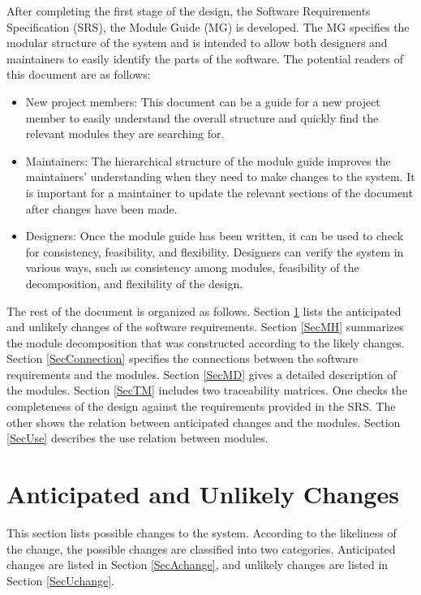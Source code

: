 \documentclass[12pt, titlepage]{article}
\begin{document}
After completing the first stage of the design, the Software Requirements
Specification (SRS), the Module Guide (MG) is developed. The MG
specifies the modular structure of the system and is intended to allow both
designers and maintainers to easily identify the parts of the software.  The
potential readers of this document are as follows:

\begin{itemize}
\item New project members: This document can be a guide for a new project member
  to easily understand the overall structure and quickly find the
  relevant modules they are searching for.
\item Maintainers: The hierarchical structure of the module guide improves the
  maintainers' understanding when they need to make changes to the system. It is
  important for a maintainer to update the relevant sections of the document
  after changes have been made.
\item Designers: Once the module guide has been written, it can be used to
  check for consistency, feasibility, and flexibility. Designers can verify the
  system in various ways, such as consistency among modules, feasibility of the
  decomposition, and flexibility of the design.
\end{itemize}

The rest of the document is organized as follows. Section
\ref{SecChange} lists the anticipated and unlikely changes of the software
requirements. Section \ref{SecMH} summarizes the module decomposition that
was constructed according to the likely changes. Section \ref{SecConnection}
specifies the connections between the software requirements and the
modules. Section \ref{SecMD} gives a detailed description of the
modules. Section \ref{SecTM} includes two traceability matrices. One checks
the completeness of the design against the requirements provided in the SRS. The
other shows the relation between anticipated changes and the modules. Section
\ref{SecUse} describes the use relation between modules.

\section{Anticipated and Unlikely Changes} \label{SecChange}

This section lists possible changes to the system. According to the likeliness
of the change, the possible changes are classified into two
categories. Anticipated changes are listed in Section \ref{SecAchange}, and
unlikely changes are listed in Section \ref{SecUchange}.
\end{document}
